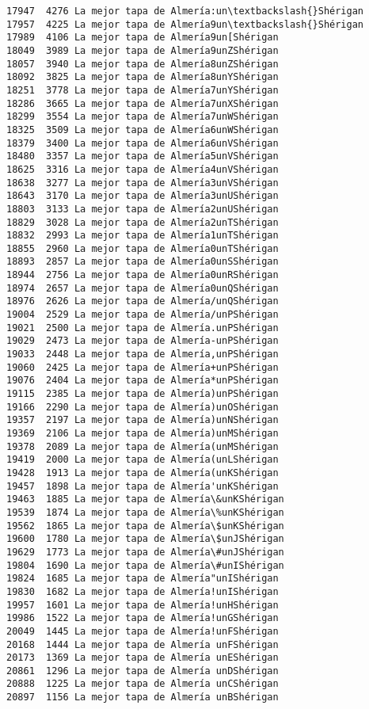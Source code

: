 \documentclass[11pt]{article}
\begin{document}
\begin{Verbatim}[commandchars=\\\{\}]
17947  4276 La mejor tapa de Almería:un\textbackslash{}Shérigan
17957  4225 La mejor tapa de Almería9un\textbackslash{}Shérigan
17989  4106 La mejor tapa de Almería9un[Shérigan
18049  3989 La mejor tapa de Almería9unZShérigan
18057  3940 La mejor tapa de Almería8unZShérigan
18092  3825 La mejor tapa de Almería8unYShérigan
18251  3778 La mejor tapa de Almería7unYShérigan
18286  3665 La mejor tapa de Almería7unXShérigan
18299  3554 La mejor tapa de Almería7unWShérigan
18325  3509 La mejor tapa de Almería6unWShérigan
18379  3400 La mejor tapa de Almería6unVShérigan
18480  3357 La mejor tapa de Almería5unVShérigan
18625  3316 La mejor tapa de Almería4unVShérigan
18638  3277 La mejor tapa de Almería3unVShérigan
18643  3170 La mejor tapa de Almería3unUShérigan
18803  3133 La mejor tapa de Almería2unUShérigan
18829  3028 La mejor tapa de Almería2unTShérigan
18832  2993 La mejor tapa de Almería1unTShérigan
18855  2960 La mejor tapa de Almería0unTShérigan
18893  2857 La mejor tapa de Almería0unSShérigan
18944  2756 La mejor tapa de Almería0unRShérigan
18974  2657 La mejor tapa de Almería0unQShérigan
18976  2626 La mejor tapa de Almería/unQShérigan
19004  2529 La mejor tapa de Almería/unPShérigan
19021  2500 La mejor tapa de Almería.unPShérigan
19029  2473 La mejor tapa de Almería-unPShérigan
19033  2448 La mejor tapa de Almería,unPShérigan
19060  2425 La mejor tapa de Almería+unPShérigan
19076  2404 La mejor tapa de Almería*unPShérigan
19115  2385 La mejor tapa de Almería)unPShérigan
19166  2290 La mejor tapa de Almería)unOShérigan
19357  2197 La mejor tapa de Almería)unNShérigan
19369  2106 La mejor tapa de Almería)unMShérigan
19378  2089 La mejor tapa de Almería(unMShérigan
19419  2000 La mejor tapa de Almería(unLShérigan
19428  1913 La mejor tapa de Almería(unKShérigan
19457  1898 La mejor tapa de Almería'unKShérigan
19463  1885 La mejor tapa de Almería\&unKShérigan
19539  1874 La mejor tapa de Almería\%unKShérigan
19562  1865 La mejor tapa de Almería\$unKShérigan
19600  1780 La mejor tapa de Almería\$unJShérigan
19629  1773 La mejor tapa de Almería\#unJShérigan
19804  1690 La mejor tapa de Almería\#unIShérigan
19824  1685 La mejor tapa de Almería"unIShérigan
19830  1682 La mejor tapa de Almería!unIShérigan
19957  1601 La mejor tapa de Almería!unHShérigan
19986  1522 La mejor tapa de Almería!unGShérigan
20049  1445 La mejor tapa de Almería!unFShérigan
20168  1444 La mejor tapa de Almería unFShérigan
20173  1369 La mejor tapa de Almería unEShérigan
20861  1296 La mejor tapa de Almería unDShérigan
20888  1225 La mejor tapa de Almería unCShérigan
20897  1156 La mejor tapa de Almería unBShérigan

\end{Verbatim}
\end{document}
